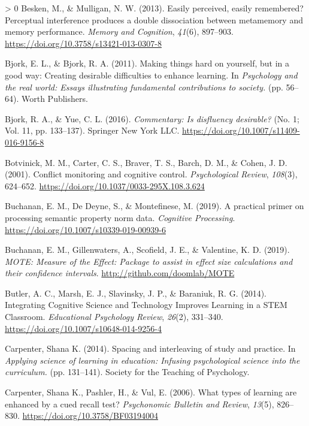\documentclass[
  english,
  jou]{apa7}
\newlength{\cslhangindent}
\newenvironment{CSLReferences}[3] %
 {%
  \setlength{\parindent}{0pt}
  \ifodd #1 \everypar{\setlength{\hangindent}{\cslhangindent}}\ignorespaces\fi
  \ifnum #2 > 0
  \setlength{\parskip}{#2\baselineskip}
  \fi
 }%
 {}
\begin{document}
\begin{CSLReferences}{1}{0}
\leavevmode\hypertarget{ref-Besken2013}{}%
Besken, M., \& Mulligan, N. W. (2013). {Easily perceived, easily remembered? Perceptual interference produces a double dissociation between metamemory and memory performance}. \emph{Memory and Cognition}, \emph{41}(6), 897--903. \url{https://doi.org/10.3758/s13421-013-0307-8}

\leavevmode\hypertarget{ref-Bjork2011}{}%
Bjork, E. L., \& Bjork, R. A. (2011). {Making things hard on yourself, but in a good way: Creating desirable difficulties to enhance learning.} In \emph{Psychology and the real world: Essays illustrating fundamental contributions to society.} (pp. 56--64). Worth Publishers.

\leavevmode\hypertarget{ref-Bjork2016}{}%
Bjork, R. A., \& Yue, C. L. (2016). \emph{{Commentary: Is disfluency desirable?}} (No. 1; Vol. 11, pp. 133--137). Springer New York LLC. \url{https://doi.org/10.1007/s11409-016-9156-8}

\leavevmode\hypertarget{ref-Botvinick2001}{}%
Botvinick, M. M., Carter, C. S., Braver, T. S., Barch, D. M., \& Cohen, J. D. (2001). {Conflict monitoring and cognitive control}. \emph{Psychological Review}, \emph{108}(3), 624--652. \url{https://doi.org/10.1037/0033-295X.108.3.624}

\leavevmode\hypertarget{ref-Buchanan2019}{}%
Buchanan, E. M., De Deyne, S., \& Montefinese, M. (2019). {A practical primer on processing semantic property norm data}. \emph{Cognitive Processing}. \url{https://doi.org/10.1007/s10339-019-00939-6}

\leavevmode\hypertarget{ref-R-MOTE}{}%
Buchanan, E. M., Gillenwaters, A., Scofield, J. E., \& Valentine, K. D. (2019). \emph{{MOTE: Measure of the Effect}: Package to assist in effect size calculations and their confidence intervals}. \url{http://github.com/doomlab/MOTE}

\leavevmode\hypertarget{ref-Butler2014}{}%
Butler, A. C., Marsh, E. J., Slavinsky, J. P., \& Baraniuk, R. G. (2014). {Integrating Cognitive Science and Technology Improves Learning in a STEM Classroom}. \emph{Educational Psychology Review}, \emph{26}(2), 331--340. \url{https://doi.org/10.1007/s10648-014-9256-4}

\leavevmode\hypertarget{ref-Carpenter2014}{}%
Carpenter, Shana K. (2014). {Spacing and interleaving of study and practice.} In \emph{Applying science of learning in education: Infusing psychological science into the curriculum.} (pp. 131--141). Society for the Teaching of Psychology.

\leavevmode\hypertarget{ref-Carpenter2006}{}%
Carpenter, Shana K., Pashler, H., \& Vul, E. (2006). {What types of learning are enhanced by a cued recall test?} \emph{Psychonomic Bulletin and Review}, \emph{13}(5), 826--830. \url{https://doi.org/10.3758/BF03194004}


\end{CSLReferences}
\end{document}
